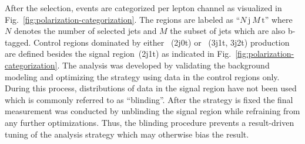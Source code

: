 After the selection, events are categorized per lepton channel as visualized in Fig.~\ref{fig:polarization-categorization}. The regions are labeled as ``$N\,\mathrm{j}~M\,\mathrm{t}$'' where $N$ denotes the number of selected jets and $M$ the subset of jets which are also b-tagged. Control regions dominated by either \wjets~(2j0t) or \ttbar~(3j1t, 3j2t) production are defined besides the signal region~(2j1t) as indicated in Fig.~\ref{fig:polarization-categorization}. The analysis was developed by validating the background modeling and optimizing the strategy using data in the control regions only. During this process, distributions of data in the signal region have not been used which is commonly referred to as ``blinding''. After the strategy is fixed the final measurement was conducted by unblinding the signal region while refraining from any further optimizations. Thus, the blinding procedure prevents a result-driven tuning of the analysis strategy which may otherwise bias the result.


